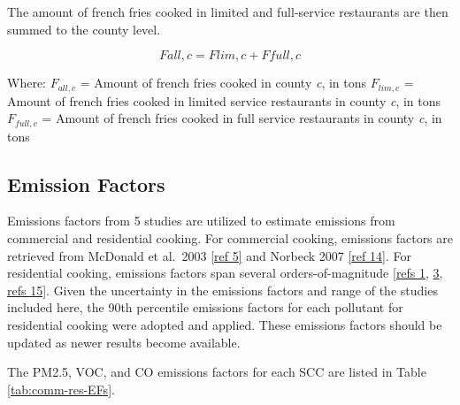\documentclass[
  11pt,
  oneside]{book}
\begin{document}
The amount of french fries cooked in limited and full-service restaurants are then summed to the county level.

\begin{equation} 
  F{all,c} = F{lim,c} + F{full,c}
  \label{eq:FF-total-county}
\end{equation}

Where: \newline
\(F_{all,c}\) = Amount of french fries cooked in county \emph{c}, in tons \newline
\(F_{lim,c}\) = Amount of french fries cooked in limited service restaurants in county \emph{c}, in tons \newline
\(F_{full,c}\) = Amount of french fries cooked in full service restaurants in county \emph{c}, in tons \newline

\subsection{Emission Factors}\label{emission-factors}

Emissions factors from 5 studies are utilized to estimate emissions from commercial and residential cooking. For commercial cooking, emissions factors are retrieved from McDonald et al.~2003 \hyperref[cooking-references]{{[}ref 5{]}} and Norbeck 2007 \hyperref[cooking-references]{{[}ref 14{]}}. For residential cooking, emissions factors span several orders-of-magnitude {[}\hyperref[cooking-references]{refs 1}, \hyperref[cooking-references]{3}, \hyperref[cooking-references]{refs 15}{]}. Given the uncertainty in the emissions factors and range of the studies included here, the 90th percentile emissions factors for each pollutant for residential cooking were adopted and applied. These emissions factors should be updated as newer results become available.

The PM2.5, VOC, and CO emissions factors for each SCC are listed in Table \ref{tab:comm-res-EFs}.
\end{document}
